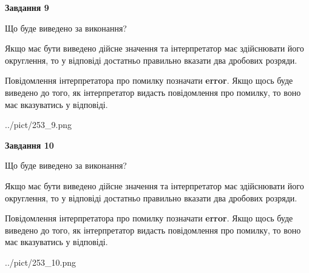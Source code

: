 \documentclass[12pt, ukrainian]{article}
\begin{document}
{\begin {Large}
{\begin {center}\textbf{Завдання 9}\end {center}}\par
Що буде виведено за виконання? \par

Якщо має бути виведено дійсне значення та інтерпретатор має здійснювати його округлення, 
то у відповіді достатньо правильно вказати два дробових розряди.

Повідомлення інтерпретатора про помилку позначати \textbf{error}.
Якщо щось буде виведено до того, як інтерпретатор видасть повідомлення про помилку, 
то воно має вказуватись у відповіді. \par

\begin{center}
	{../pict/253_9.png}
\end{center}
\newpage

{\begin {center}\textbf{Завдання 10}\end {center}}\par
Що буде виведено за виконання? \par

Якщо має бути виведено дійсне значення та інтерпретатор має здійснювати його округлення, 
то у відповіді достатньо правильно вказати два дробових розряди.

Повідомлення інтерпретатора про помилку позначати \textbf{error}.
Якщо щось буде виведено до того, як інтерпретатор видасть повідомлення про помилку, 
то воно має вказуватись у відповіді. \par

\begin{center}
	{../pict/253_10.png}
\end{center}
\newpage

\end {Large}}
\end{document}
